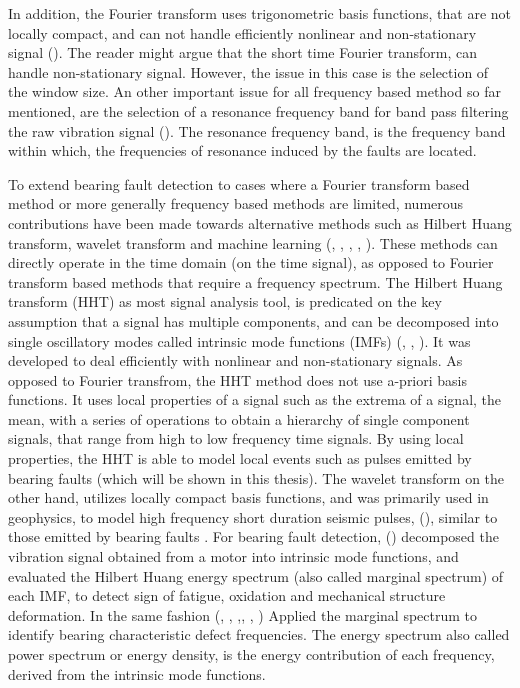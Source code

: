 \documentclass[../Main/thesis.tex]{subfiles}
\begin{document}
 \justify
  In addition, the Fourier transform uses trigonometric basis functions, that are not locally compact, and can not handle efficiently nonlinear and non-stationary signal (\cite{huang98}). The reader might argue that the short time Fourier transform, can handle non-stationary signal. However, the issue in this case is the selection of the window size. An other important issue for all frequency based method so far mentioned, are the selection of a resonance frequency band for band pass filtering the raw vibration signal (\cite{zhao2014}). The resonance frequency band, is the frequency band within which, the frequencies of resonance induced by the faults are located.
 \justify
 
 
\justify
 To extend bearing fault detection to cases where a Fourier transform based method or more generally frequency based methods are limited,
numerous contributions have been made towards alternative methods such as Hilbert Huang transform, wavelet transform and machine learning (\cite{zhang2019}, \cite{xiaoan2018}, \cite{rai2016}, \cite{konar2011}, \cite{rai2006} ). These methods can directly operate in the time domain (on the time signal), as opposed to Fourier transform based methods that require a frequency spectrum. 
\justify
The Hilbert Huang transform (HHT) as most signal analysis tool, is predicated on the key assumption that a signal has multiple components, and can be decomposed into single oscillatory modes called intrinsic mode functions (IMFs) (\cite{fosso2019}, \cite{huang08}, \cite{huang98}). It was developed to deal efficiently with nonlinear and non-stationary signals. As opposed to Fourier transfrom, the HHT method does not use a-priori basis functions. It uses local properties of a signal such as the extrema of a signal, the mean, with a series of operations to obtain a hierarchy of single component signals, that range from high to low frequency time signals. By using local properties, the HHT is able to model local events such as pulses emitted by bearing faults (which will be shown in this thesis). The wavelet transform on the other hand, utilizes locally compact basis functions, and was primarily used in geophysics, to model high frequency short duration seismic pulses, (\cite{albert09}), similar to those emitted by bearing faults .
\justify
For bearing fault detection, (\cite{fan2016}) decomposed the vibration signal obtained from a motor into intrinsic mode functions, and evaluated the Hilbert Huang energy spectrum (also called marginal spectrum) of each IMF, to detect sign of fatigue, oxidation and mechanical structure deformation. In the same fashion (\cite{peng2004}, \cite{soualhi2015}, \cite{osman2014},\cite{osman2013a}, \cite{osman2013b}, \cite{li2008}) Applied the marginal spectrum to identify bearing characteristic defect frequencies. The energy spectrum also called power spectrum or energy density, is the energy contribution of each frequency, derived from the intrinsic mode functions.
\end{document}
